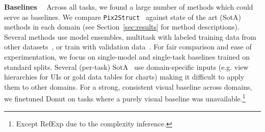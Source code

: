 \documentclass{article} %
\newcommand\ourmodel{{\texttt{Pix2Struct}}}
\begin{document}
\textbf{Baselines}~~
Across all tasks, we found a large number of methods which could serve as baselines. We compare \ourmodel~ against state of the art (SotA) methods in each domain (see Section~\ref{sec:results} for method descriptions). Several methods use model ensembles, multitask with labeled training data from other datasets~\citep{powalski2021going,wang2022git}, or train with validation data~\citep{li2021structurallm}. For fair comparison and ease of experimentation,
we focus on single-model and single-task baselines trained on standard splits. Several (per-task) SotA~\citep{li2021vut,masry-etal-2022-chartqa} use  domain-specific inputs (e.g. view hierarchies for UIs or gold data tables for charts) making it difficult to apply them to other domains. 
For a strong, consistent visual baseline across domains, we finetuned Donut on tasks where a purely visual baseline was unavailable.\footnote{Except RefExp due to the complexity inference.}
\end{document}
